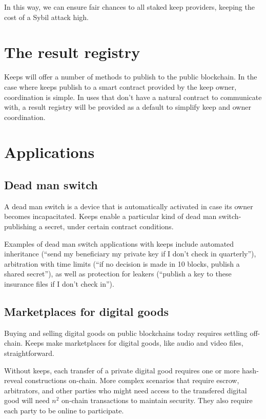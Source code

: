 \documentclass[11pt]{article}
\begin{document}
In this way, we can ensure fair chances to all staked keep providers,
keeping the cost of a Sybil attack high.

\section{The result registry}

Keeps will offer a number of methods to publish to the public
blockchain. In the case where keeps publish to a smart contract
provided by the keep owner, coordination is simple. In uses that don't
have a natural contract to communicate with, a result registry will be
provided as a default to simplify keep and owner coordination.

\section{Applications}
\label{applications}

\subsection{Dead man switch}

A dead man switch is a device that is automatically activated in case
its owner becomes incapacitated. Keeps enable a particular kind of
dead man switch- publishing a secret, under certain contract
conditions.

Examples of dead man switch applications with keeps include automated
inheritance (``send my beneficiary my private key if I don't check in
quarterly''), arbitration with time limits (``if no decision is made in
10 blocks, publish a shared secret''), as well as protection for
leakers (``publish a key to these insurance files if I don't check
in'').

\subsection{Marketplaces for digital goods}

Buying and selling digital goods on public blockchains today requires
settling off-chain. Keeps make marketplaces for digital goods, like
audio and video files, straightforward.

Without keeps, each transfer of a private digital good requires one or
more hash-reveal constructions on-chain. More complex scenarios
that require escrow, arbitrators, and other parties who might need
access to the transfered digital good will need ${n^2}$ on-chain
transactions to maintain security. They also require each party to be
online to participate.
\end{document}
